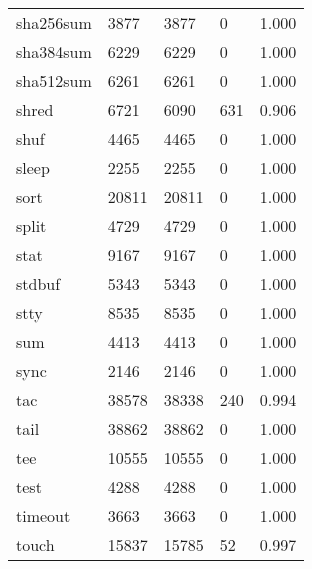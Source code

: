 \begin{longtable}{lp{3.0cm}p{3.0cm}p{3.0cm}p{3.0cm}}
sha256sum &                     3877 &         3877 &             0 &                    1.000 \\
sha384sum &                     6229 &         6229 &             0 &                    1.000 \\
sha512sum &                     6261 &         6261 &             0 &                    1.000 \\
shred     &                     6721 &         6090 &           631 &                    0.906 \\
shuf      &                     4465 &         4465 &             0 &                    1.000 \\
sleep     &                     2255 &         2255 &             0 &                    1.000 \\
sort      &                    20811 &        20811 &             0 &                    1.000 \\
split     &                     4729 &         4729 &             0 &                    1.000 \\
stat      &                     9167 &         9167 &             0 &                    1.000 \\
stdbuf    &                     5343 &         5343 &             0 &                    1.000 \\
stty      &                     8535 &         8535 &             0 &                    1.000 \\
sum       &                     4413 &         4413 &             0 &                    1.000 \\
sync      &                     2146 &         2146 &             0 &                    1.000 \\
tac       &                    38578 &        38338 &           240 &                    0.994 \\
tail      &                    38862 &        38862 &             0 &                    1.000 \\
tee       &                    10555 &        10555 &             0 &                    1.000 \\
test      &                     4288 &         4288 &             0 &                    1.000 \\
timeout   &                     3663 &         3663 &             0 &                    1.000 \\
touch     &                    15837 &        15785 &            52 &                    0.997 \\

\end{longtable}
